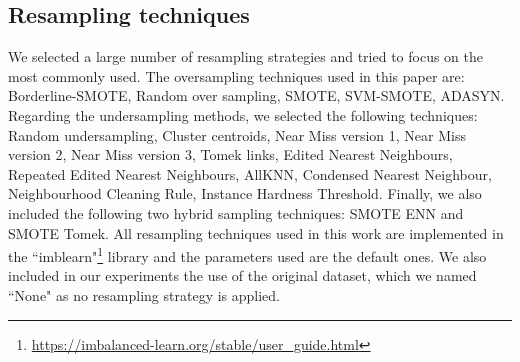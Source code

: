 \documentclass{article}
\begin{document}
\subsection{Resampling techniques}
We selected a large number of resampling strategies and tried to focus on the most commonly used. The oversampling techniques used in this paper are: Borderline-SMOTE, Random over sampling, SMOTE, SVM-SMOTE, ADASYN. Regarding the undersampling methods, we selected the following techniques: Random undersampling, Cluster centroids, Near Miss version 1, Near Miss version 2, Near Miss version 3, Tomek links, Edited Nearest Neighbours, Repeated Edited Nearest Neighbours, AllKNN, Condensed Nearest Neighbour, Neighbourhood Cleaning Rule, Instance Hardness Threshold. Finally, we also included the following two hybrid sampling techniques: SMOTE ENN and SMOTE Tomek. All resampling techniques used in this work are implemented in the ``imblearn"\footnote{\url{https://imbalanced-learn.org/stable/user_guide.html}} library and the parameters used are the default ones. We also included in our experiments the use of the original dataset, which we named ``None" as no resampling strategy is applied.
\end{document}
